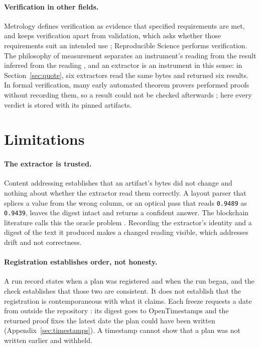 \documentclass{article}
\newcommand{\code}[1]{\texttt{#1}}
\begin{document}
\paragraph{Verification in other fields.} Metrology defines verification as evidence that specified
requirements are met, and keeps verification apart from validation, which asks whether those
requirements suit an intended use \citep{jcgm2012vim}; Reproducible Science performs verification. The
philosophy of measurement separates an instrument's reading from the result inferred from the
reading \citep{tal2017calibration}, and an extractor is an instrument in this sense: in
Section~\ref{sec:quote}, six extractors read the same bytes and returned six results. In formal
verification, many early automated theorem provers performed proofs without recording them, so a
result could not be checked afterwards \citep{mackenzie2001mechanizing}; here every verdict is
stored with its pinned artifacts.

\section{Limitations}
\label{sec:limits}

\paragraph{The extractor is trusted.} Content addressing establishes that an artifact's bytes did
not change and nothing about whether the extractor read them correctly. A layout parser that
splices a value from the wrong column, or an optical pass that reads \code{0.9489} as
\code{0.9439}, leaves the digest intact and returns a confident answer. The blockchain literature calls this the
oracle problem \citep{albizri2021oracle}. Recording the extractor's identity and a digest of the text it produced
makes a changed reading visible, which addresses drift and not correctness.

\paragraph{Registration establishes order, not honesty.} A run record states when a plan was
registered and when the run began, and the check establishes that those two are consistent. It
does not establish that the registration is contemporaneous with what it claims. Each
freeze requests a date from outside the repository \citep{adams2001rfc3161}: its digest goes to OpenTimestamps
\citep{todd2016opentimestamps} and the returned proof fixes the latest date the plan could have been
written (Appendix~\ref{sec:timestamps}). A timestamp cannot show that a plan was not written earlier
and withheld.
\end{document}
